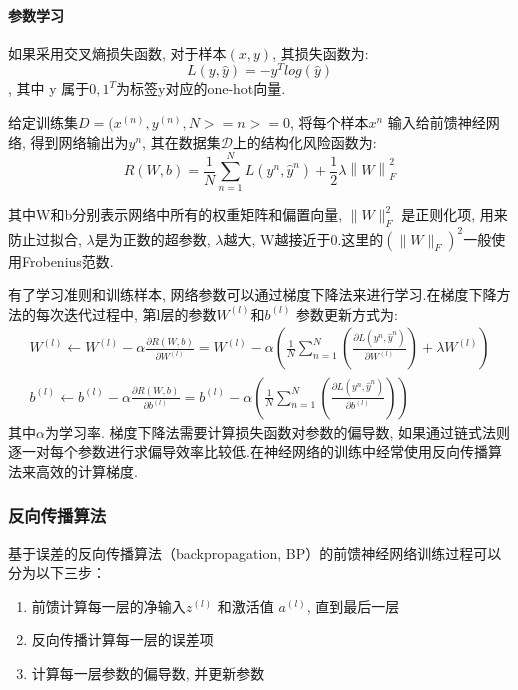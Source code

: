 \documentclass[a4paper]{article}
\begin{document}
\paragraph{参数学习}
如果采用交叉熵损失函数, 对于样本$(x, y)$, 其损失函数为:
$$L(y, \hat{y}) = -y^T log (\hat{y})$$, 
其中 y 属于${0, 1}^T$为标签y对应的one-hot向量.

给定训练集$D={(x^{(n)}, y^{(n)},  N>=n>=0}$, 将每个样本$x^n$ 输入给前馈神经网络, 得到网络输出为$y^n$, 其在数据集$\mathcal{D}$上的结构化风险函数为:
$$R(W, b)=\frac{1}{N}\sum_{n=1}^{N} L(y^n, \hat{y}^n) + \frac{1}{2}\lambda \left \| W \right \|_F^2$$
 
其中W和b分别表示网络中所有的权重矩阵和偏置向量,  $\|W\|_F^2$ 是正则化项, 用来防止过拟合, $\lambda$是为正数的超参数, $\lambda$越大, W越接近于0.这里的$(\|W\|_F)^2$一般使用Frobenius范数.
 
有了学习准则和训练样本, 网络参数可以通过梯度下降法来进行学习.在梯度下降方法的每次迭代过程中, 第l层的参数$ W^{(l)} $和$ b^{(l)}$ 参数更新方式为:
\begin{gather*}
    W^{(l)} \leftarrow W^{(l)} - \alpha \frac{\partial R(W, b)}{\partial W^{(l)}}=W^{(l)} - \alpha ( \frac{1}{N} \sum_{n=1}^{N}(\frac{\partial L(y^n, \hat{y}^n)}{\partial W^{(l)}}) + \lambda W^{(l)} )\\b^{(l)} \leftarrow b^{(l)} - \alpha \frac{\partial R(W, b)}{\partial b^{(l)}}=b^{(l)} - \alpha ( \frac{1}{N} \sum_{n=1}^{N}(\frac{\partial L(y^n, \hat{y}^n)}{\partial b^{(l)}}) ) 
\end{gather*}
其中$\alpha$为学习率.
梯度下降法需要计算损失函数对参数的偏导数, 如果通过链式法则逐一对每个参数进行求偏导效率比较低.在神经网络的训练中经常使用反向传播算法来高效的计算梯度. 
\subsubsection{反向传播算法}
基于误差的反向传播算法（backpropagation, BP）的前馈神经网络训练过程可以分为以下三步：
\begin{enumerate} 
    \renewcommand{\labelenumi}{(\theenumi)}
\item 前馈计算每一层的净输入$z^{(l)}$ 和激活值 $a^{(l)}$, 直到最后一层
\item 反向传播计算每一层的误差项
\item 计算每一层参数的偏导数, 并更新参数
\end{enumerate}
\end{document}
